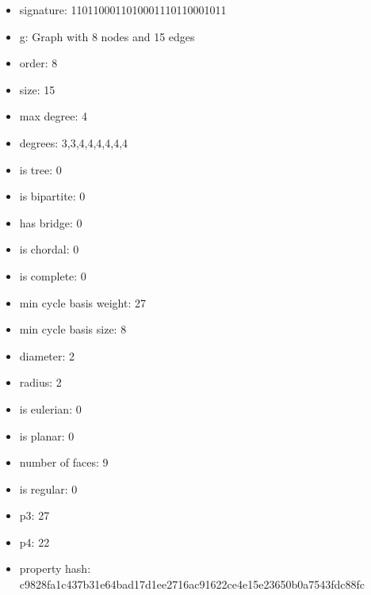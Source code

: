 \begin{itemize}
\item signature: 1101100011010001110110001011
\item g: Graph with 8 nodes and 15 edges
\item order: 8
\item size: 15
\item max degree: 4
\item degrees: 3,3,4,4,4,4,4,4
\item is tree: 0
\item is bipartite: 0
\item has bridge: 0
\item is chordal: 0
\item is complete: 0
\item min cycle basis weight: 27
\item min cycle basis size: 8
\item diameter: 2
\item radius: 2
\item is eulerian: 0
\item is planar: 0
\item number of faces: 9
\item is regular: 0
\item p3: 27
\item p4: 22
\item property hash: c9828fa1c437b31e64bad17d1ee2716ac91622ce4e15e23650b0a7543fdc88fc
\end{itemize}
\newpage
\begin{figure}
\end{figure}
